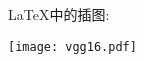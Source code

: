 \documentclass{ctexart}%
\begin{document}
	\LaTeX{}中的插图:  %
	
	\texttt{[image: vgg16.pdf]}%
\end{document}
